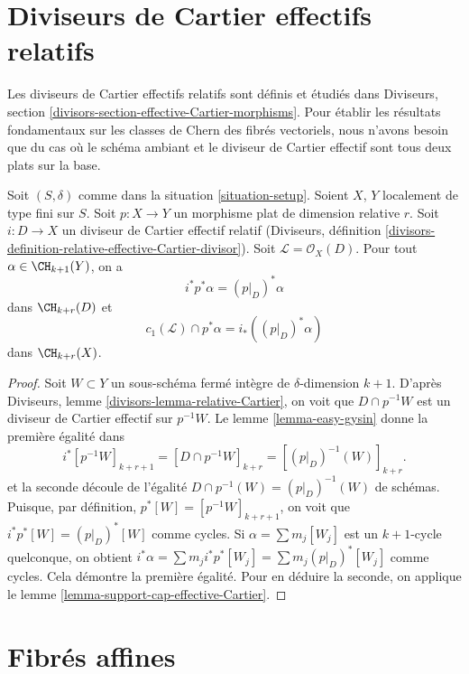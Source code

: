\section{Diviseurs de Cartier effectifs relatifs}
\label{section-relative-effective-cartier}

\noindent
Les diviseurs de Cartier effectifs relatifs sont définis et étudiés
dans Diviseurs, section \ref{divisors-section-effective-Cartier-morphisms}.
Pour établir les résultats fondamentaux sur les classes de Chern des fibrés vectoriels,
nous n'avons besoin que du cas où le schéma ambiant et le diviseur de Cartier
effectif sont tous deux plats sur la base.

\begin{lemma}
\label{lemma-relative-effective-cartier}
Soit $(S, \delta)$ comme dans la situation \ref{situation-setup}.
Soient $X$, $Y$ localement de type fini sur $S$.
Soit $p : X \to Y$ un morphisme plat de dimension relative $r$.
Soit $i : D \to X$ un diviseur de Cartier effectif relatif
(Diviseurs, définition
\ref{divisors-definition-relative-effective-Cartier-divisor}).
Soit $\mathcal{L} = \mathcal{O}_X(D)$.
Pour tout $\alpha \in \CH_{k + 1}(Y)$, on a
$$
i^*p^*\alpha = (p|_D)^*\alpha
$$
dans $\CH_{k + r}(D)$ et
$$
c_1(\mathcal{L}) \cap p^*\alpha = i_* ((p|_D)^*\alpha)
$$
dans $\CH_{k + r}(X)$.
\end{lemma}

\begin{proof}
Soit $W \subset Y$ un sous-schéma fermé intègre de $\delta$-dimension
$k + 1$. D'après Diviseurs, lemme \ref{divisors-lemma-relative-Cartier},
on voit que $D \cap p^{-1}W$ est un diviseur de Cartier
effectif sur $p^{-1}W$. Le lemme \ref{lemma-easy-gysin}
donne la première égalité dans
$$
i^*[p^{-1}W]_{k + r + 1} =
[D \cap p^{-1}W]_{k + r} =
[(p|_D)^{-1}(W)]_{k + r}.
$$
et la seconde découle de l'égalité $D \cap p^{-1}(W) = (p|_D)^{-1}(W)$ de schémas.
Puisque, par définition, $p^*[W] = [p^{-1}W]_{k + r + 1}$, on voit que
$i^*p^*[W] = (p|_D)^*[W]$ comme cycles. Si $\alpha = \sum m_j[W_j]$ est un
$k + 1$-cycle quelconque, on obtient
$i^*\alpha = \sum m_j i^*p^*[W_j] = \sum m_j(p|_D)^*[W_j]$ comme cycles.
Cela démontre la première égalité. Pour en déduire la seconde,
on applique le lemme \ref{lemma-support-cap-effective-Cartier}.
\end{proof}








\section{Fibrés affines}
\label{section-affine-vector}

